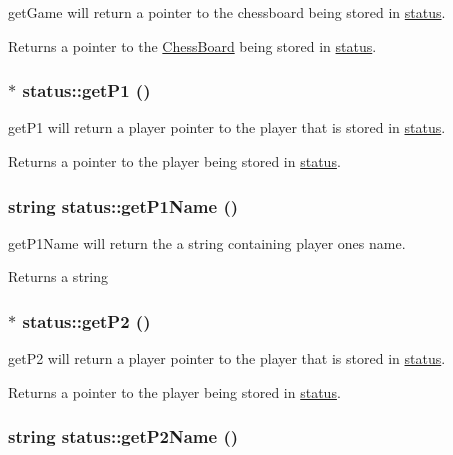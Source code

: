 getGame will return a pointer to the chessboard being stored in \hyperlink{classstatus}{status}. \begin{DoxyReturn}{Returns}
a pointer to the \hyperlink{classChessBoard}{ChessBoard} being stored in \hyperlink{classstatus}{status}. 
\end{DoxyReturn}
\hypertarget{classstatus_a9f4ec14653e8e058f86e9f666e75d237}{
\subsubsection[{getP1}]{ $\ast$ status::getP1 ()}}
\label{classstatus_a9f4ec14653e8e058f86e9f666e75d237}


getP1 will return a player pointer to the player that is stored in \hyperlink{classstatus}{status}. \begin{DoxyReturn}{Returns}
a pointer to the player being stored in \hyperlink{classstatus}{status}. 
\end{DoxyReturn}
\hypertarget{classstatus_a21344f4838dff393b03f3bf6594746d7}{
\subsubsection[{getP1Name}]{\setlength{\rightskip}{0pt plus 5cm}string status::getP1Name ()}}
\label{classstatus_a21344f4838dff393b03f3bf6594746d7}


getP1Name will return the a string containing player ones name. \begin{DoxyReturn}{Returns}
a string 
\end{DoxyReturn}
\hypertarget{classstatus_a944ffb3c3b34b2def529314610337fdb}{
\subsubsection[{getP2}]{ $\ast$ status::getP2 ()}}
\label{classstatus_a944ffb3c3b34b2def529314610337fdb}


getP2 will return a player pointer to the player that is stored in \hyperlink{classstatus}{status}. \begin{DoxyReturn}{Returns}
a pointer to the player being stored in \hyperlink{classstatus}{status}. 
\end{DoxyReturn}
\hypertarget{classstatus_a4b4ad3dc4ac1444ebd6be59f6771ce0d}{
\subsubsection[{getP2Name}]{\setlength{\rightskip}{0pt plus 5cm}string status::getP2Name ()}}
\label{classstatus_a4b4ad3dc4ac1444ebd6be59f6771ce0d}


